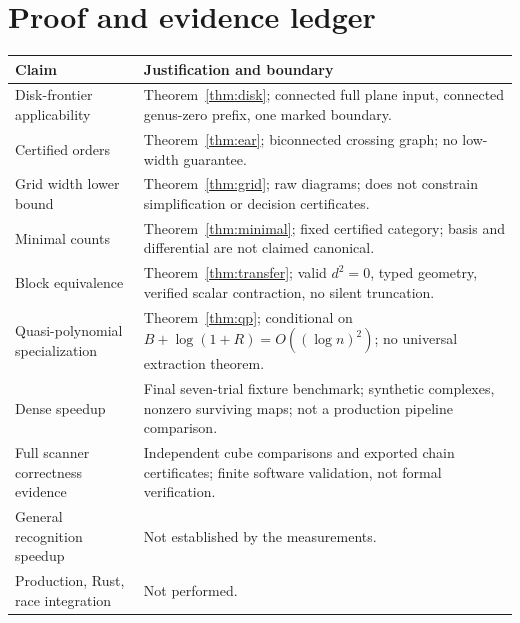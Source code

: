 \documentclass[11pt]{article}
\theoremstyle{definition}\newtheorem{definition}[theorem]{Definition}
\theoremstyle{remark}\newtheorem{remark}[theorem]{Remark}
\begin{document}
\section{Proof and evidence ledger}
\begin{longtable}{@{}p{}p{}@{}}
\toprule
Claim & Justification and boundary\\\midrule\endhead
Disk-frontier applicability & Theorem~\ref{thm:disk}; connected full plane input,
connected genus-zero prefix, one marked boundary.\\
Certified orders & Theorem~\ref{thm:ear}; biconnected crossing graph;
no low-width guarantee.\\
Grid width lower bound & Theorem~\ref{thm:grid}; raw diagrams; does not constrain
simplification or decision certificates.\\
Minimal counts & Theorem~\ref{thm:minimal}; fixed certified category; basis and
differential are not claimed canonical.\\
Block equivalence & Theorem~\ref{thm:transfer}; valid $d^2=0$, typed geometry,
verified scalar contraction, no silent truncation.\\
Quasi-polynomial specialization & Theorem~\ref{thm:qp}; conditional on
$B+\log(1+R)=O((\log n)^2)$; no universal extraction theorem.\\
Dense speedup & Final seven-trial fixture benchmark; synthetic complexes,
nonzero surviving maps; not a production pipeline comparison.\\
Full scanner correctness evidence & Independent cube comparisons and exported
chain certificates; finite software validation, not formal verification.\\
General recognition speedup & Not established by the measurements.\\
Production, Rust, race integration & Not performed.\\\bottomrule
\end{longtable}
\end{document}
